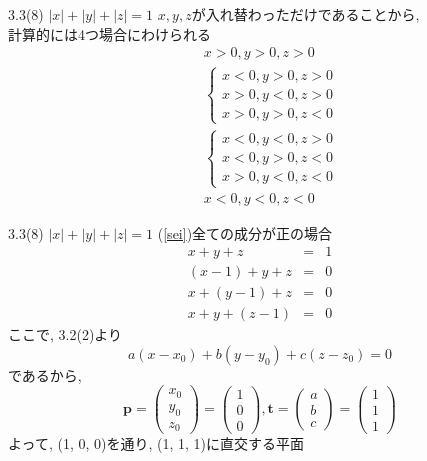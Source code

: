\documentclass{beamer}
\begin{document}
\begin{frame}{3.3(8) $|x| + |y| + |z|  = 1$}
  $x, y, z$が入れ替わっただけであることから, \\
  計算的には4つ場合にわけられる
  \begin{eqnarray}
    \label{sei}
    && x > 0, y > 0, z > 0 \\
    \label{hu1}
    && \left\{
    \begin{array}{c}
    x < 0, y > 0, z > 0 \\
    x > 0, y < 0, z > 0 \\
    x > 0, y > 0, z < 0 
    \end{array} \right. \\
    \label{hu2}
    && \left\{
    \begin{array}{c}
    x < 0, y < 0, z > 0 \\
    x < 0, y > 0, z < 0 \\
    x > 0, y < 0, z < 0 
    \end{array} \right. \\
    \label{hu}
    && x < 0, y < 0, z < 0 
  \end{eqnarray}
\end{frame}




\begin{frame}{3.3(8) $|x| + |y| + |z|  = 1$ \hspace{5mm} (\ref{sei})全ての成分が正の場合}
  \begin{eqnarray*}
    x + y + z &=& 1\\
    (x-1) + y + z &=& 0\\
    x + (y-1) + z &=& 0\\
    x + y + (z-1) &=& 0
  \end{eqnarray*}
  ここで, 3.2(2)より
  \begin{equation*}
    a(x-x_0) + b(y-y_0) + c(z-z_0) = 0
  \end{equation*}
  であるから,
  \begin{equation*}
    \bm{p} = 
    \begin{pmatrix}
      x_0\\
      y_0\\
      z_0
    \end{pmatrix} =
    \begin{pmatrix}
      1\\
      0\\
      0
    \end{pmatrix} , 
    \bm{t} = 
    \begin{pmatrix}
      a\\
      b\\
      c
    \end{pmatrix} =
    \begin{pmatrix}
      1\\
      1\\
      1
    \end{pmatrix}
  \end{equation*}
  よって, (1, 0, 0)を通り, (1, 1, 1)に直交する平面
\end{frame}
\end{document}
